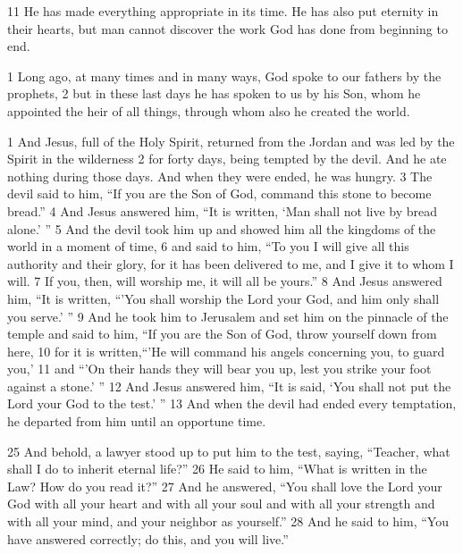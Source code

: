 \begin{bible}
11 He has made everything appropriate in its time. He has also put eternity in their hearts, but man cannot discover the work God has done from beginning to end.

1 Long ago, at many times and in many ways, God spoke to our fathers by the prophets, 2 but in these last days he has spoken to us by his Son, whom he appointed the heir of all things, through whom also he created the world.

1 And Jesus, full of the Holy Spirit, returned from the Jordan and was led by the Spirit in the wilderness 2 for forty days, being tempted by the devil. And he ate nothing during those days. And when they were ended, he was hungry. 3 The devil said to him, ``If you are the Son of God, command this stone to become bread.'' 4 And Jesus answered him, ``It is written, `Man shall not live by bread alone.' '' 5 And the devil took him up and showed him all the kingdoms of the world in a moment of time, 6 and said to him, ``To you I will give all this authority and their glory, for it has been delivered to me, and I give it to whom I will. 7 If you, then, will worship me, it will all be yours.'' 8 And Jesus answered him, ``It is written, ``'You shall worship the Lord your God, and him only shall you serve.' '' 9 And he took him to Jerusalem and set him on the pinnacle of the temple and said to him, ``If you are the Son of God, throw yourself down from here, 10 for it is written,``'He will command his angels concerning you, to guard you,' 11 and ``'On their hands they will bear you up, lest you strike your foot against a stone.' '' 12 And Jesus answered him, ``It is said, `You shall not put the Lord your God to the test.' '' 13 And when the devil had ended every temptation, he departed from him until an opportune time. 

25 And behold, a lawyer stood up to put him to the test, saying, ``Teacher, what shall I do to inherit eternal life?'' 26 He said to him, ``What is written in the Law? How do you read it?'' 27 And he answered, ``You shall love the Lord your God with all your heart and with all your soul and with all your strength and with all your mind, and your neighbor as yourself.'' 28 And he said to him, ``You have answered correctly; do this, and you will live.'' 

\end{bible}

